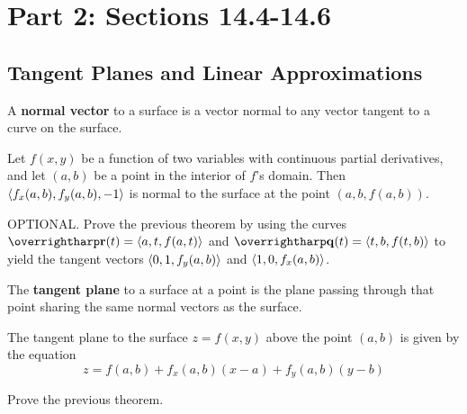 \documentclass[letterpaper, twoside, 12pt]{book}
\begin{document}
\setcounter{chapter}{1}

\chapter{Part 2: Sections 14.4-14.6}

\setcounter{chapter}{14}
\setcounter{section}{3}

\section{Tangent Planes and Linear Approximations} %

\begin{definition}
  A \textbf{normal vector} to a surface is a vector normal to
  any vector tangent to a curve on the surface.
\end{definition}

\begin{theorem}
  Let $f(x,y)$ be a function of two variables with continuous partial
  derivatives, and let $(a,b)$ be a point in the interior of $f$'s
  domain. Then $\langle f_x(a,b),f_y(a,b),-1\rangle$ is normal to the surface
  at the point $(a,b,f(a,b))$.
\end{theorem}

          \begin{problem}
            OPTIONAL. Prove the previous theorem by using the curves
            $\vect{r}(t)=\<a,t,f(a,t)\>$ and
            $\vect{q}(t)=\<t,b,f(t,b)\>$ to yield the tangent vectors
            $\langle0,1,f_y(a,b)\rangle$ and $\langle1,0,f_x(a,b)\rangle$.
          \end{problem}

          \begin{solution}

          \end{solution}

\begin{definition}
  The \textbf{tangent plane} to a surface at a point is the plane passing
  through that point sharing the same normal vectors as the surface.
\end{definition}

\begin{theorem}
  The tangent plane to the surface $z=f(x,y)$ above the point $(a,b)$
  is given by the equation
    \[
      z = f(a,b) + f_x(a,b)(x-a)+f_y(a,b)(y-b)
    \]
\end{theorem}

          \begin{problem}
            Prove the previous theorem.
          \end{problem}
\end{document}
